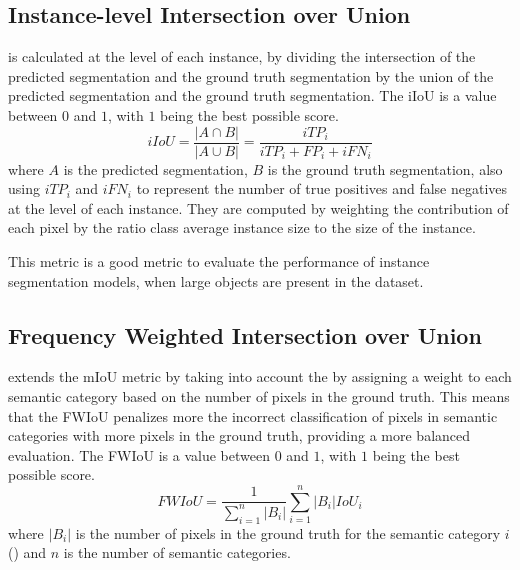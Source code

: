   \subsection{Instance-level Intersection over Union}

     is calculated at the level
    of each instance, by dividing the intersection of the predicted segmentation
    and the ground truth segmentation by the union of the predicted segmentation
    and the ground truth segmentation\cite{paszke2016enet, intelligence2021modern}.
    The iIoU is a value between $0$ and $1$, with $1$ being the best possible score.
    \begin{equation}
      \label{eq:iiou}
      iIoU = \frac{{|A \cap B|}}{{|A \cup B|}} = \frac{iTP_i}{iTP_i + FP_i + iFN_i}
    \end{equation}
    where $A$ is the predicted segmentation, $B$ is the ground truth segmentation,
    also using $iTP_i$ and $iFN_i$ to represent the number of true positives and
    false negatives at the level of each instance. They are computed by weighting
    the contribution of each pixel by the ratio class average instance size to
    the size of the instance\cite{paszke2016enet}.

    This metric is a good metric to evaluate the performance of instance segmentation
    models, when large objects are present in the dataset.

  \subsection{Frequency Weighted Intersection over Union}

     extends the mIoU metric
    by taking into account the  by assigning a weight
    to each semantic category based on the number of pixels in the ground truth. This
    means that the FWIoU penalizes more the incorrect classification of pixels in
    semantic categories with more pixels in the ground truth, providing a more balanced
    evaluation\cite{lin2017refinenet,long2015fully}. The FWIoU is a value between $0$
    and $1$, with $1$ being the best possible score.
    \begin{equation}
      \label{eq:fwiou}
      FWIoU = \frac{1}{\sum_{i=1}^{n} |B_i|} \sum_{i=1}^{n} |B_i| IoU_i
    \end{equation}
    where $|B_i|$ is the number of pixels in the ground truth for the semantic
    category $i$ () and $n$ is the number of semantic categories.
